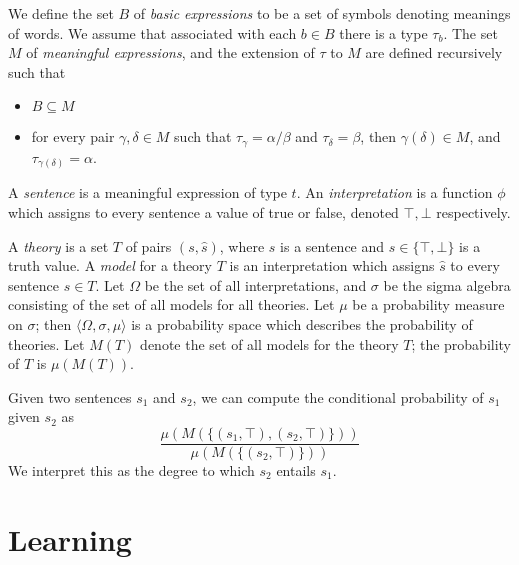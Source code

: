 \documentclass[letterpaper]{article}
\begin{document}
We define the set $B$ of \emph{basic expressions} to be a set of
symbols denoting meanings of words. We assume that associated with
each $b\in B$ there is a type $\tau_b$. The set $M$ of
\emph{meaningful expressions}, and the extension of $\tau$ to $M$ are
defined recursively such that
\begin{itemize}
\item $B\subseteq M$
\item for every pair $\gamma,\delta\in M$ such that $\tau_\gamma =
  \alpha/\beta$ and $\tau_\delta = \beta$, then $\gamma(\delta)\in
  M$, and $\tau_{\gamma(\delta)} = \alpha$.
\end{itemize}

A \emph{sentence} is a meaningful expression of type $t$. An
\emph{interpretation} is a function $\phi$ which assigns to every
sentence a value of true or false, denoted $\top, \bot$ respectively.

A \emph{theory} is a set $T$ of pairs $(s,\hat{s})$, where $s$ is a
sentence and $\hat{s}\in\{\top,\bot\}$ is a truth value. A
\emph{model} for a theory $T$ is an interpretation which assigns
$\hat{s}$ to every sentence $s\in T$. Let $\Omega$ be the set of all
interpretations, and $\sigma$ be the sigma algebra consisting of the
set of all models for all theories. Let $\mu$ be a probability measure
on $\sigma$; then $\langle\Omega,\sigma,\mu\rangle$ is a probability
space which describes the probability of theories. Let $M(T)$ denote
the set of all models for the theory $T$; the probability of $T$ is
$\mu(M(T))$.

Given two sentences $s_1$ and $s_2$, we can compute the conditional
probability of $s_1$ given $s_2$ as
$$\frac{\mu(M(\{(s_1, \top), (s_2, \top)\}))}{\mu(M(\{(s_2,\top)\}))}$$
We interpret this as the degree to which $s_2$ entails $s_1$.


\section{Learning}
\end{document}
